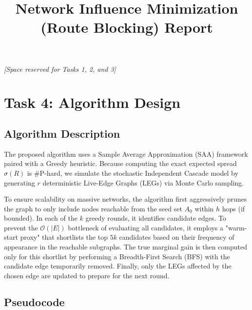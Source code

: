 \documentclass[11pt]{article}
\title{Network Influence Minimization (Route Blocking) Report}
\author{}
\date{}
\begin{document}
\maketitle

\vspace{2cm}
\begin{center}
    \textit{[Space reserved for Tasks 1, 2, and 3]}
\end{center}
\vspace{2cm}

\section*{Task 4: Algorithm Design}

\subsection*{Algorithm Description}
The proposed algorithm uses a Sample Average Approximation (SAA) framework paired with a Greedy heuristic. Because computing the exact expected spread $\sigma(R)$ is \#P-hard, we simulate the stochastic Independent Cascade model by generating $r$ deterministic Live-Edge Graphs (LEGs) via Monte Carlo sampling. 

To ensure scalability on massive networks, the algorithm first aggressively prunes the graph to only include nodes reachable from the seed set $A_0$ within $h$ hops (if bounded). In each of the $k$ greedy rounds, it identifies candidate edges. To prevent the $\mathcal{O}(|E|)$ bottleneck of evaluating all candidates, it employs a "warm-start proxy" that shortlists the top $5k$ candidates based on their frequency of appearance in the reachable subgraphs. The true marginal gain is then computed only for this shortlist by performing a Breadth-First Search (BFS) with the candidate edge temporarily removed. Finally, only the LEGs affected by the chosen edge are updated to prepare for the next round.

\subsection*{Pseudocode}
\end{document}
